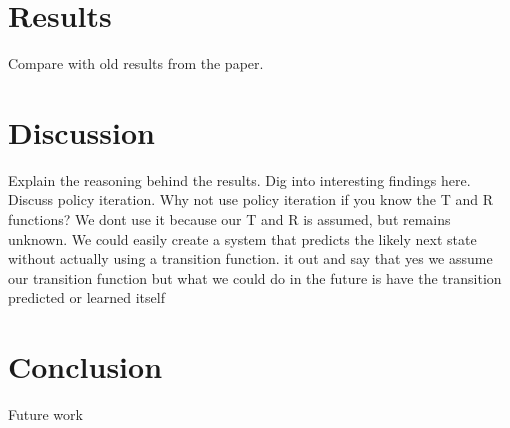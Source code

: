 \section{Results}
Compare with old results from the paper.

\section{Discussion}
Explain the reasoning behind the results. Dig into interesting findings here.
Discuss policy iteration.
Why not use policy iteration if you know the T and R functions? 
	We dont use it because our T and R is assumed, but remains unknown. We could easily create a system that predicts the likely next state without actually using a transition function.  it out and say that yes we assume our transition function but what we could do in the future is have the transition predicted or learned itself
	
\section{Conclusion}
Future work